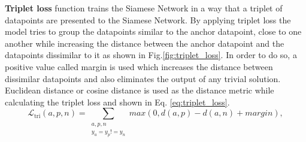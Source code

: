 \textbf{Triplet loss} function\cite{weinberger2009distance} trains the Siamese Network in a way that a triplet of datapoints are presented to the Siamese Network. By applying triplet loss the model tries to group the datapoints similar to the anchor datapoint, close to one another while increasing the distance between the anchor datapoint and the datapoints dissimilar to it as shown in Fig.\ref{fig:triplet_loss}. In order to do so, a positive value called margin is used which increases the distance between dissimilar datapoints and also eliminates the output of any trivial solution. Euclidean distance or cosine distance is used as the distance metric while calculating the triplet loss and shown in Eq. \ref{eq:triplet_loss}. \cite{hermans2017defense,siamese_network}
\begin{equation}
  \label{eq:triplet_loss}
  \mathcal{L}_{\textrm{tri}}(a,p,n)=\sum_{\substack{a,p,n \\ y_{a}=y_{p}!=y_{n}}} max(0,d(a,p)-d(a,n)+margin),
\end{equation}
